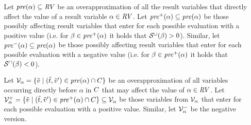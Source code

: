 \begin{definition}
  Let $\mathit{pre}(\alpha) \subseteq \mathit{RV}$ be an overapproximation of all the result variables that directly affect the value of a result variable $\alpha \in \mathit{RV}$.
  Let $\mathit{pre}^+(\alpha) \subseteq \mathit{pre}(\alpha)$ be those possibly affecting result variables that enter for each possible evaluation with a positive value
  (i.e. for $\beta \in \mathit{pre}^+(\alpha)$ it holds that ${\mathcal{S}^\sqcup}(\beta) > 0$).
  Similar, let $\mathit{pre}^-(\alpha) \subseteq \mathit{pre}(\alpha)$ be those possibly affecting result variables that enter for each possible evaluation with a negative value
  (i.e. for $\beta \in \mathit{pre}^+(\alpha)$ it holds that ${\mathcal{S}^\sqcap}(\beta) < 0$).
\end{definition}

\begin{definition}
  Let $\mathcal{V}_\alpha = \lbrace  \tilde{v} \mid (\tilde{t}, \tilde{v}') \in \mathit{pre}(\alpha) \cap C  \rbrace$ be an overapproximation of all variables occurring directly before $\alpha$ in $C$ that may affect the value of $\alpha \in \mathit{RV}$.
  Let $\mathcal{V}^+_\alpha = \lbrace  \tilde{v} \mid (\tilde{t}, \tilde{v}') \in \mathit{pre}^+(\alpha) \cap C  \rbrace \subseteq \mathcal{V}_\alpha$ be those variables from $\mathcal{V}_\alpha$ that enter for each possible evaluation with a positive value.
  Similar, let $\mathcal{V}^-_\alpha$ be the negative version.
\end{definition}

